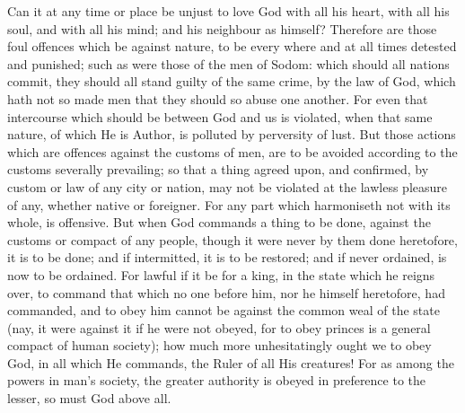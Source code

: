 \documentclass[b5paper,openright,12pt,twoside]{book}
\begin{document}
Can it at any time or place be unjust to love God with all his heart,
with all his soul, and with all his mind; and his neighbour as himself?
Therefore are those foul offences which be against nature, to be every
where and at all times detested and punished; such as were those of the
men of Sodom: which should all nations commit, they should all stand
guilty of the same crime, by the law of God, which hath not so made men
that they should so abuse one another. For even that intercourse which
should be between God and us is violated, when that same nature, of
which He is Author, is polluted by perversity of lust. But those
actions which are offences against the customs of men, are to be avoided
according to the customs severally prevailing; so that a thing agreed
upon, and confirmed, by custom or law of any city or nation, may not be
violated at the lawless pleasure of any, whether native or foreigner.
For any part which harmoniseth not with its whole, is offensive. But
when God commands a thing to be done, against the customs or compact of
any people, though it were never by them done heretofore, it is to be
done; and if intermitted, it is to be restored; and if never ordained,
is now to be ordained. For lawful if it be for a king, in the state
which he reigns over, to command that which no one before him, nor he
himself heretofore, had commanded, and to obey him cannot be against the
common weal of the state (nay, it were against it if he were not obeyed,
for to obey princes is a general compact of human society); how much
more unhesitatingly ought we to obey God, in all which He commands, the
Ruler of all His creatures! For as among the powers in man's society,
the greater authority is obeyed in preference to the lesser, so must God
above all.
\end{document}

